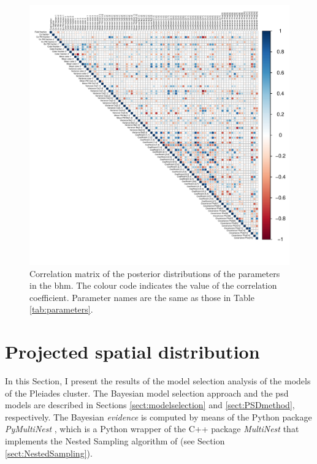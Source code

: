 \begin{figure}[ht!]
\begin{center}
\includegraphics[page=1,width=1.1\textwidth]{background/Figures/BHM/Correlations.pdf}
\caption{Correlation matrix of the posterior distributions of the parameters in the \gls{bhm}. The colour code indicates the value of the correlation coefficient. Parameter names are the same as those in Table \ref{tab:parameters}.}
\label{fig:correlations}
\end{center}
\end{figure}

\section{Projected spatial distribution}
\label{sect:PSDresults}
In this Section, I present the results of the model selection analysis of the  models of the Pleiades cluster. The Bayesian model selection approach and the \gls{psd} models are described in Sections \ref{sect:modelselection} and \ref{sect:PSDmethod}, respectively. The Bayesian \emph{evidence} is computed by means of the Python package \emph{PyMultiNest} \citep{Buchner2014}, which is a Python wrapper of the C++ package \emph{MultiNest} \citep{Feroz2009} that implements the Nested Sampling algorithm of \citet{Skilling2004,Skilling2006} (see Section \ref{sect:NestedSampling}).


